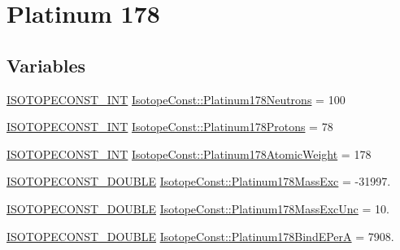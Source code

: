 \hypertarget{group___isotope_const-_platinum-_pt178}{}\section{Platinum 178}
\label{group___isotope_const-_platinum-_pt178}
\subsection*{Variables}
\begin{DoxyCompactItemize}
\item 
\mbox{\hyperlink{group___isotope_const-_macros_ga5f18360b3e99483a35c32d789e62621c}{I\+S\+O\+T\+O\+P\+E\+C\+O\+N\+S\+T\+\_\+\+I\+NT}} \mbox{\hyperlink{group___isotope_const-_platinum-_pt178_ga6126769674ecd57b8ccd4a8256a462e1}{Isotope\+Const\+::\+Platinum178\+Neutrons}} = 100
\item 
\mbox{\hyperlink{group___isotope_const-_macros_ga5f18360b3e99483a35c32d789e62621c}{I\+S\+O\+T\+O\+P\+E\+C\+O\+N\+S\+T\+\_\+\+I\+NT}} \mbox{\hyperlink{group___isotope_const-_platinum-_pt178_ga134c83e84da16d8a48e9ab30a94db80c}{Isotope\+Const\+::\+Platinum178\+Protons}} = 78
\item 
\mbox{\hyperlink{group___isotope_const-_macros_ga5f18360b3e99483a35c32d789e62621c}{I\+S\+O\+T\+O\+P\+E\+C\+O\+N\+S\+T\+\_\+\+I\+NT}} \mbox{\hyperlink{group___isotope_const-_platinum-_pt178_ga63485d0cc51f2c7ec5275c561eb2e933}{Isotope\+Const\+::\+Platinum178\+Atomic\+Weight}} = 178
\item 
\mbox{\hyperlink{group___isotope_const-_macros_ga8f45a7272ce02c0b4c65c44636ed719a}{I\+S\+O\+T\+O\+P\+E\+C\+O\+N\+S\+T\+\_\+\+D\+O\+U\+B\+LE}} \mbox{\hyperlink{group___isotope_const-_platinum-_pt178_gabfe9d07c55a3682edb412875ee6f2df7}{Isotope\+Const\+::\+Platinum178\+Mass\+Exc}} = -\/31997.
\item 
\mbox{\hyperlink{group___isotope_const-_macros_ga8f45a7272ce02c0b4c65c44636ed719a}{I\+S\+O\+T\+O\+P\+E\+C\+O\+N\+S\+T\+\_\+\+D\+O\+U\+B\+LE}} \mbox{\hyperlink{group___isotope_const-_platinum-_pt178_gafee6f554a1b284ea9f02b91352c1f9e5}{Isotope\+Const\+::\+Platinum178\+Mass\+Exc\+Unc}} = 10.
\item 
\mbox{\hyperlink{group___isotope_const-_macros_ga8f45a7272ce02c0b4c65c44636ed719a}{I\+S\+O\+T\+O\+P\+E\+C\+O\+N\+S\+T\+\_\+\+D\+O\+U\+B\+LE}} \mbox{\hyperlink{group___isotope_const-_platinum-_pt178_gac273fcd284d29c98791e53cd430777f1}{Isotope\+Const\+::\+Platinum178\+Bind\+E\+PerA}} = 7908.
\item 

\end{DoxyCompactItemize}
